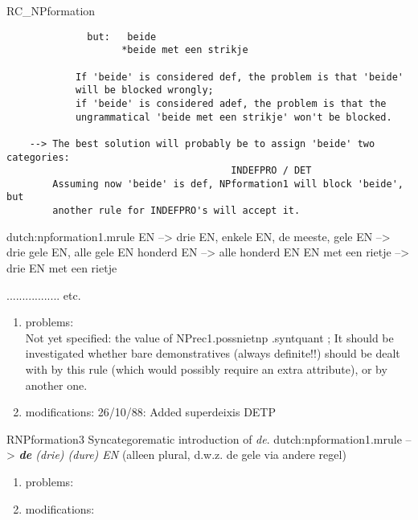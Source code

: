 \begin{mruleclass}{RC_NPformation}
\begin{members}
\begin{member}
\begin{verbatim}
              but:   beide
                    *beide met een strikje
           
            If 'beide' is considered def, the problem is that 'beide'  
            will be blocked wrongly;
            if 'beide' is considered adef, the problem is that the 
            ungrammatical 'beide met een strikje' won't be blocked.

    --> The best solution will probably be to assign 'beide' two categories: 
                                       INDEFPRO / DET
        Assuming now 'beide' is def, NPformation1 will block 'beide', but 
        another rule for INDEFPRO's will accept it.

\end{verbatim}
\file dutch:npformation1.mrule
\semantics \nosemantics
\example
         EN                 --> drie EN, enkele EN, de meeste, 
         gele EN            --> drie gele EN, alle gele EN
         honderd EN         --> alle honderd EN
         EN met een rietje  --> drie EN met een rietje
       
                  ................. etc.

\remarks\mbox{}
\begin{enumerate}
\item problems:\\
    Not yet specified: the value of NPrec1.possnietnp
                                          .syntquant         ;
    It should be investigated whether bare demonstratives (always 
    definite!!) should be dealt with by this rule (which would possibly
    require an extra attribute), or by another one.
\item modifications: 26/10/88: Added superdeixis DETP\\

\end{enumerate}

\end{member}
\begin{member}
 RNPformation3
Syncategorematic introduction of {\em de}.
\file dutch:npformation1.mrule
\semantics \nosemantics
{} --> 
{\em {\bf de} (drie) (dure) EN} (alleen plural, d.w.z. de gele via andere regel)
\remarks\mbox{}
\begin{enumerate}
\item problems:\\
\item modifications:\\


\end{enumerate}
\end{member}
\end{members}
\end{mruleclass}
